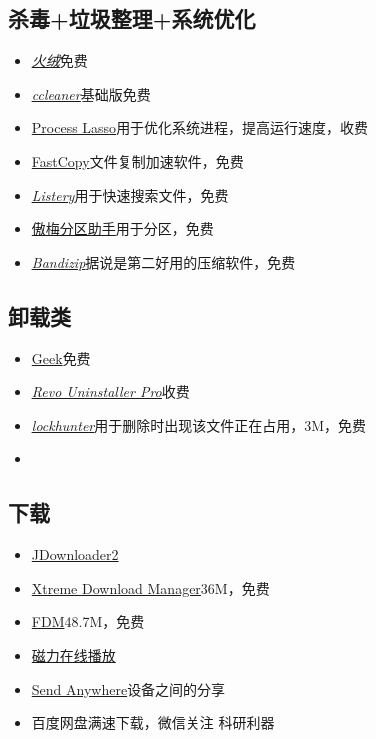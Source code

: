 \documentclass[UTF8]{ctexbook}
\begin{document}
\subsection{杀毒+垃圾整理+系统优化}
\begin{itemize}
	\item \underline{\textit{\href{https://www.huorong.cn}{火绒}}}\quad 免费
	\item \underline{\textit{\href{http://ccleaner.soft88.com}{ccleaner}}}\quad 基础版免费
	\item \href{https://bitsum.com}{Process Lasso}\quad 用于优化系统进程，提高运行速度，收费
	\item \href{https://fastcopy.jp/en/}{FastCopy}\quad 文件复制加速软件，免费
	\item \underline{\textit{\href{https://www.listary.com}{Listery}}}\quad 用于快速搜索文件，免费
	\item \href{http://www.disktool.cn/download.html}{傲梅分区助手}\quad 用于分区，免费
	\item \underline{\textit{\href{http://www.bandisoft.com}{Bandizip}}}\quad 据说是第二好用的压缩软件，免费
\end{itemize}

\subsection{卸载类}
\begin{itemize}
	\item \href{https://geekuninstaller.com}{Geek}\quad 免费
	\item \underline{\textit{\href{https://www.revouninstaller.com/}{Revo Uninstaller Pro}}}\quad 收费
	\item \underline{\textit{\href{https://lockhunter.com}{lockhunter}}}\quad 用于删除时出现该文件正在占用，3M，免费
	\item
\end{itemize}

\subsection{下载}
\begin{itemize}
	\item \href{http://jdownloader.org/jdownloader2}{JDownloader2}
	\item \href{http://xdman.sourceforge.net}{Xtreme Download Manager}\quad 36M，免费
	\item \href{https://www.freedownloadmanager.org/}{FDM}\quad 48.7M，免费
	\item \href{https://webtorrent.io}{磁力在线播放}
	\item \href{https://send-anywhere.com}{Send Anywhere}\quad 设备之间的分享
	\item 百度网盘满速下载，微信关注 科研利器
\end{itemize}
\end{document}
